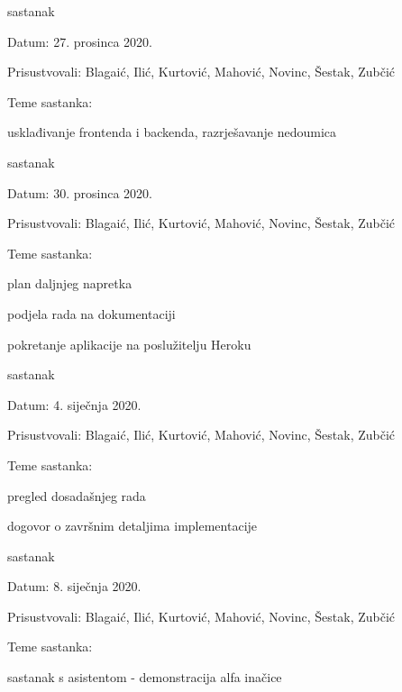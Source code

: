 \begin{packed_enum}
			\item  sastanak
			\item[] \begin{packed_item}
				\item Datum: 27. prosinca 2020.
				\item Prisustvovali: Blagaić, Ilić, Kurtović, Mahović, Novinc, Šestak, Zubčić
				\item Teme sastanka:
				\begin{packed_item}
					\item  usklađivanje frontenda i backenda, razrješavanje nedoumica
				\end{packed_item}
			\end{packed_item}
		
			\item  sastanak
			\item[] \begin{packed_item}
				\item Datum: 30. prosinca 2020.
				\item Prisustvovali: Blagaić, Ilić, Kurtović, Mahović, Novinc, Šestak, Zubčić
				\item Teme sastanka:
				\begin{packed_item}
					\item  plan daljnjeg napretka
					\item  podjela rada na dokumentaciji
					\item  pokretanje aplikacije na poslužitelju Heroku
				\end{packed_item}
			\end{packed_item}
		
			\item  sastanak
			\item[] \begin{packed_item}
				\item Datum: 4. siječnja 2020.
				\item Prisustvovali: Blagaić, Ilić, Kurtović, Mahović, Novinc, Šestak, Zubčić
				\item Teme sastanka:
				\begin{packed_item}
					\item  pregled dosadašnjeg rada
					\item  dogovor o završnim detaljima implementacije
				\end{packed_item}
			\end{packed_item}
		
			\item  sastanak
			\item[] \begin{packed_item}
				\item Datum: 8. siječnja 2020.
				\item Prisustvovali: Blagaić, Ilić, Kurtović, Mahović, Novinc, Šestak, Zubčić
				\item Teme sastanka:
				\begin{packed_item}
					\item sastanak s asistentom - demonstracija alfa inačice
				\end{packed_item}
			\end{packed_item}
			

\end{packed_enum}
